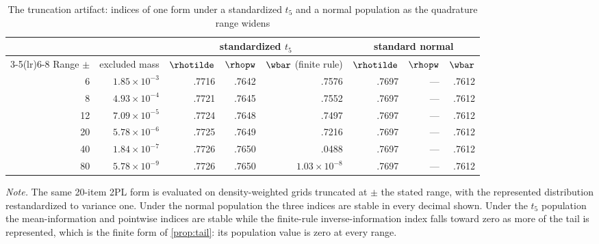 \begin{table}[!htbp]
\centering
\caption{The truncation artifact: indices of one form under a standardized $t_5$ and a normal population as the quadrature range widens}
\label{tab:tail-trunc}
\small
\setlength{\tabcolsep}{4pt}
\begin{tabular}{rrrrrrrr}
\toprule
 & & \multicolumn{3}{c}{standardized $t_5$} & \multicolumn{3}{c}{standard normal} \\
\cmidrule(lr){3-5}\cmidrule(lr){6-8}
Range $\pm$ & excluded mass & $\rhotilde$ & $\rhopw$ & $\wbar$ (finite rule) & $\rhotilde$ & $\rhopw$ & $\wbar$ \\
\midrule
6 & $1.85\times10^{-3}$ & .7716 & .7642 & .7576 & .7697 & --- & .7612 \\
8 & $4.93\times10^{-4}$ & .7721 & .7645 & .7552 & .7697 & --- & .7612 \\
12 & $7.09\times10^{-5}$ & .7724 & .7648 & .7497 & .7697 & --- & .7612 \\
20 & $5.78\times10^{-6}$ & .7725 & .7649 & .7216 & .7697 & --- & .7612 \\
40 & $1.84\times10^{-7}$ & .7726 & .7650 & .0488 & .7697 & --- & .7612 \\
80 & $5.78\times10^{-9}$ & .7726 & .7650 & $1.03\times10^{-8}$ & .7697 & --- & .7612 \\
\bottomrule
\end{tabular}

\smallskip
\begin{minipage}{0.95\textwidth}
\footnotesize
\emph{Note.} The same 20-item 2PL form is evaluated on density-weighted grids truncated at $\pm$ the stated range, with the represented distribution restandardized to variance one. Under the normal population the three indices are stable in every decimal shown. Under the $t_5$ population the mean-information and pointwise indices are stable while the finite-rule inverse-information index falls toward zero as more of the tail is represented, which is the finite form of \cref{prop:tail}: its population value is zero at every range.
\end{minipage}
\end{table}

